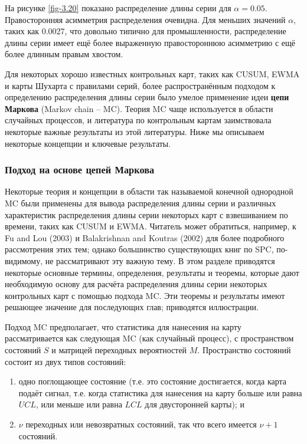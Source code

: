 На рисунке \ref{fig-3.20} показано распределение длины серии для \(\alpha = 0.05\). Правосторонняя асимметрия распределения очевидна. Для меньших значений \(\alpha\), таких как 0.0027, что довольно типично для промышленности, распределение длины серии имеет ещё более выраженную правостороннюю асимметрию с ещё более длинным правым хвостом.

Для некоторых хорошо известных контрольных карт, таких как CUSUM, EWMA и карты Шухарта с правилами серий, более распространённым подходом к определению распределения длины серии было умелое применение идеи \textbf{цепи Маркова} (Markov chain -- MC). Теория MC чаще используется в области случайных процессов, и литература по контрольным картам заимствовала некоторые важные результаты из этой литературы. Ниже мы описываем некоторые концепции и ключевые результаты.

\subsubsection{Подход на основе цепей Маркова}

Некоторые теория и концепции в области так называемой конечной однородной MC были применены для вывода распределения длины серии и различных характеристик распределения длины серии некоторых карт с взвешиванием по времени, таких как CUSUM и EWMA. Читатель может обратиться, например, к Fu and Lou (2003) и Balakrishnan and Koutras (2002) для более подробного рассмотрения этих тем; однако большинство существующих книг по SPC, по-видимому, не рассматривают эту важную тему. В этом разделе приводятся некоторые основные термины, определения, результаты и теоремы, которые дают необходимую основу для расчёта распределения длины серии некоторых контрольных карт с помощью подхода MC. Эти теоремы и результаты имеют решающее значение для последующих глав; приводятся иллюстрации.

Подход MC предполагает, что статистика для нанесения на карту рассматривается как следующая MC (как случайный процесс), с пространством состояний \(S\) и матрицей переходных вероятностей \(M\). Пространство состояний состоит из двух типов состояний:

\begin{enumerate}
	\item одно поглощающее состояние (т.е. это состояние достигается, когда карта подаёт сигнал, т.е. когда статистика для нанесения на карту больше или равна \(UCL\), или меньше или равна \(LCL\) для двусторонней карты); и
	\item \(\nu\) переходных или невозвратных состояний, так что всего имеется \(\nu + 1\) состояний.
\end{enumerate}

